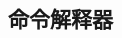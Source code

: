 \documentclass[class=book, crop=false]{standalone}
\begin{document}
\begin{CJK}{UTF8}{gbsn}

\chapter{命令解释器}



\cleardoublepage

\end{CJK}
\end{document}
